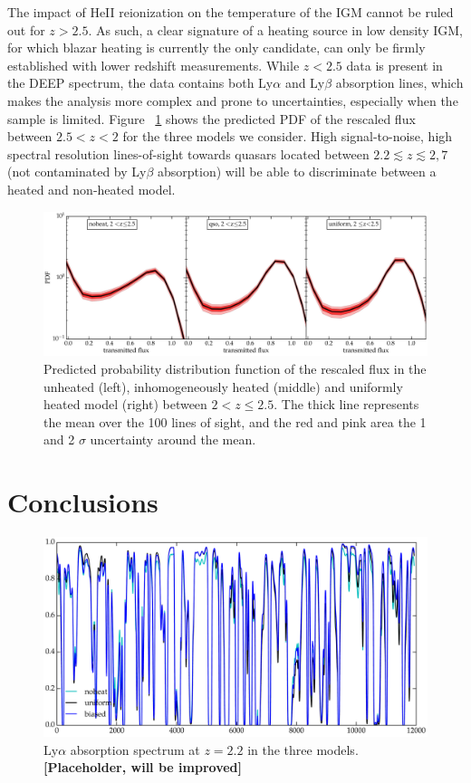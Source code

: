 \documentclass[numberedappendix]{emulateapj}
\newcommand\ALc[1]{{\color{red} \bf #1}} %
\begin{document}
The impact of HeII reionization on the temperature of the IGM cannot be ruled out for $z>2.5$. As such, a clear signature of a heating source in low density IGM, for which blazar heating is currently the only candidate, can only be firmly established with lower redshift measurements. While $z<2.5$ data is present in the DEEP spectrum, the data contains both Ly$\alpha$ and Ly$\beta$ absorption lines, which makes the analysis more complex and prone to uncertainties, especially when the sample is limited. Figure ~\ref{fig:PDF_predict} shows the predicted PDF of the rescaled flux between $2.5<z<2$ for the three models we consider. High signal-to-noise, high spectral resolution lines-of-sight towards quasars located between $2.2\lesssim z \lesssim 2,7$ (not contaminated by Ly$\beta$ absorption) will be able to discriminate between a heated and non-heated model. 




\begin{figure}[h]
\centering
\includegraphics[width = .9\textwidth ]{PDF_predict_allz_100lines}
\caption{Predicted probability distribution function of the rescaled flux in the unheated (left), inhomogeneously heated (middle) and uniformly heated model (right) between $2 <z\leq 2.5$. The thick line represents the mean over the 100 lines of sight, and the red and pink area the 1 and 2 $\sigma$ uncertainty around the mean.  }
\label{fig:PDF_predict}
\end{figure}


\section{Conclusions}\label{sec:conclusion}

\begin{figure}[h]
\centering
\includegraphics[width = .8\textwidth ]{lines_z2_2}
\caption{Ly$\alpha$ absorption spectrum at $z=2.2$ in the three models. \ALc{[Placeholder, will be improved]}}
\label{fig:bias}
\end{figure}
\end{document}
